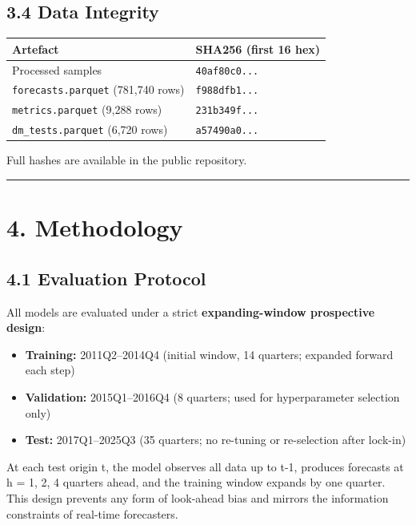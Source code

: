 \documentclass[
  11pt,
  a4paper]{article}
\newcounter{none} %
\providecommand{\tightlist}{%
  \setlength{\itemsep}{0pt}\setlength{\parskip}{0pt}}
\begin{document}
\subsection{3.4 Data Integrity}\label{data-integrity}

{\def\LTcaptype{none} %
\begin{longtable}[]{@{}ll@{}}
\toprule\noalign{}
Artefact & SHA256 (first 16 hex) \\
\midrule\noalign{}
\endhead
\bottomrule\noalign{}
\endlastfoot
Processed samples & \texttt{40af80c0...} \\
\texttt{forecasts.parquet} (781,740 rows) & \texttt{f988dfb1...} \\
\texttt{metrics.parquet} (9,288 rows) & \texttt{231b349f...} \\
\texttt{dm\_tests.parquet} (6,720 rows) & \texttt{a57490a0...} \\
\end{longtable}
}

Full hashes are available in the public repository.

\begin{center}\rule{0.5\linewidth}{0.5pt}\end{center}

\section{4. Methodology}\label{methodology}

\subsection{4.1 Evaluation Protocol}\label{evaluation-protocol}

All models are evaluated under a strict \textbf{expanding-window
prospective design}:

\begin{itemize}
\tightlist
\item
  \textbf{Training:} 2011Q2--2014Q4 (initial window, 14 quarters;
  expanded forward each step)
\item
  \textbf{Validation:} 2015Q1--2016Q4 (8 quarters; used for
  hyperparameter selection only)
\item
  \textbf{Test:} 2017Q1--2025Q3 (35 quarters; no re-tuning or
  re-selection after lock-in)
\end{itemize}

At each test origin t, the model observes all data up to t-1, produces
forecasts at h = 1, 2, 4 quarters ahead, and the training window expands
by one quarter. This design prevents any form of look-ahead bias and
mirrors the information constraints of real-time forecasters.
\end{document}
